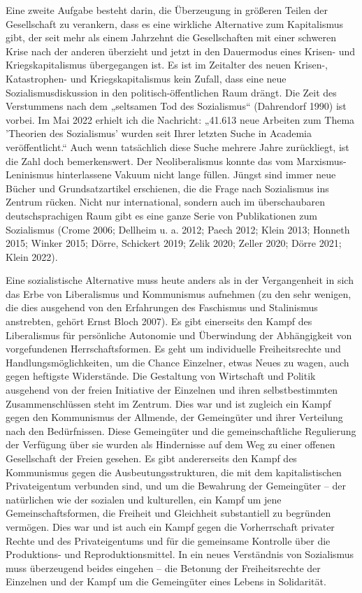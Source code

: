 \begin{multicols*}{2}
Eine zweite Aufgabe besteht darin, die Überzeugung in größeren Teilen der Gesellschaft zu verankern, dass es eine wirkliche Alternative zum Kapitalismus gibt, der seit mehr als einem Jahrzehnt die Gesellschaften mit einer schweren Krise nach der anderen überzieht und jetzt in den Dauermodus eines Krisen- und Kriegskapitalismus übergegangen ist. Es ist im Zeitalter des neuen Krisen-, Katastrophen- und Kriegskapitalismus kein Zufall, dass eine neue Sozialismusdiskussion in den politisch-öffentlichen Raum drängt. Die Zeit des Verstummens nach dem „seltsamen Tod des Sozialismus“ (Dahrendorf 1990) ist vorbei. Im Mai 2022 erhielt ich die Nachricht: „41.613 neue Arbeiten zum Thema 'Theorien des Sozialismus' wurden seit Ihrer letzten Suche in Academia veröffentlicht.“ Auch wenn tatsächlich diese Suche mehrere Jahre zurückliegt, ist die Zahl doch bemerkenswert. Der Neoliberalismus konnte das vom Marxismus-Leninismus hinterlassene Vakuum nicht lange füllen. Jüngst sind immer neue Bücher und Grundsatzartikel erschienen, die die Frage nach Sozialismus ins Zentrum rücken. Nicht nur international, sondern auch im überschaubaren deutschsprachigen Raum gibt es eine ganze Serie von Publikationen zum Sozialismus (Crome 2006; Dellheim u. a. 2012; Paech 2012; Klein 2013; Honneth 2015; Winker 2015; Dörre, Schickert 2019; Zelik 2020; Zeller 2020; Dörre 2021; Klein 2022).

Eine sozialistische Alternative muss heute anders als in der Vergangenheit in sich das Erbe von Liberalismus und Kommunismus aufnehmen (zu den sehr wenigen, die dies ausgehend von den Erfahrungen des Faschismus und Stalinismus anstrebten, gehört Ernst Bloch 2007). Es gibt einerseits den Kampf des Liberalismus für persönliche Autonomie und Überwindung der Abhängigkeit von vorgefundenen Herrschaftsformen. Es geht um individuelle Freiheitsrechte und Handlungsmöglichkeiten, um die Chance Einzelner, etwas Neues zu wagen, auch gegen heftigste Widerstände. Die Gestaltung von Wirtschaft und Politik ausgehend von der freien Initiative der Einzelnen und ihren selbstbestimmten Zusammenschlüssen steht im Zentrum. Dies war und ist zugleich ein Kampf gegen den Kommunismus der Allmende, der Gemeingüter und ihrer Verteilung nach den Bedürfnissen. Diese Gemeingüter und die gemeinschaftliche Regulierung der Verfügung über sie wurden als Hindernisse auf dem Weg zu einer offenen Gesellschaft der Freien gesehen. Es gibt andererseits den Kampf des Kommunismus gegen die Ausbeutungsstrukturen, die mit dem kapitalistischen Privateigentum verbunden sind, und um die Bewahrung der Gemeingüter – der natürlichen wie der sozialen und kulturellen, ein Kampf um jene Gemeinschaftsformen, die Freiheit und Gleichheit substantiell zu begründen vermögen. Dies war und ist auch ein Kampf gegen die Vorherrschaft privater Rechte und des Privateigentums und für die gemeinsame Kontrolle über die Produktions- und Reproduktionsmittel. In ein neues Verständnis von Sozialismus muss überzeugend beides eingehen – die Betonung der Freiheitsrechte der Einzelnen und der Kampf um die Gemeingüter eines Lebens in Solidarität.


\end{multicols*}
